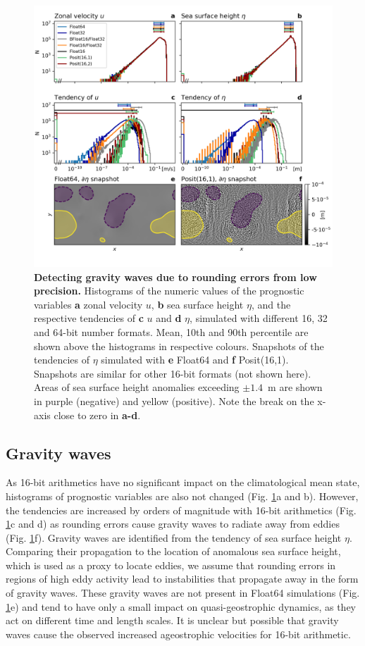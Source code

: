 \begin{figure}
\includegraphics[width=1\textwidth]{Figures/swm/tendency_hist2.png}
\caption{\textbf{Detecting gravity waves due to rounding errors from low precision.} Histograms of the numeric values of the prognostic
variables \textbf{a} zonal velocity $u$, \textbf{b} sea surface height $\eta$, and the respective tendencies of \textbf{c} $u$ and
\textbf{d} $\eta$, simulated with different 16, 32 and 64-bit number formats. Mean, 10th and 90th percentile are shown above the
histograms in respective colours. Snapshots of the tendencies of $\eta$ simulated with \textbf{e} Float64 and \textbf{f} Posit(16,1).
Snapshots are similar for other 16-bit formats (not shown here). Areas of sea surface height anomalies exceeding $\pm1.4$~m are
shown in purple (negative) and yellow (positive). Note the break on the x-axis close to zero in \textbf{a-d}.}
\label{fig:tend}
\end{figure}

\subsection{Gravity waves}

As 16-bit arithmetics have no significant impact on the climatological mean state, histograms of prognostic variables are also not
changed (Fig. \ref{fig:tend}a and b). However, the tendencies are increased by orders of magnitude with 16-bit arithmetics
(Fig. \ref{fig:tend}c and d) as rounding errors cause gravity waves to radiate away from eddies (Fig. \ref{fig:tend}f). 
Gravity waves are identified from the tendency of sea surface height $\eta$. Comparing their propagation to the location of
anomalous sea surface height, which is used as a proxy to locate eddies, we assume that rounding errors in regions
of high eddy activity lead to instabilities that propagate away in the form of gravity waves. These gravity waves are not
present in Float64 simulations (Fig. \ref{fig:tend}e) and tend to have only a small impact on quasi-geostrophic dynamics,
as they act on different time and length scales. It is unclear but possible that gravity waves cause the observed increased
ageostrophic velocities for 16-bit arithmetic.

